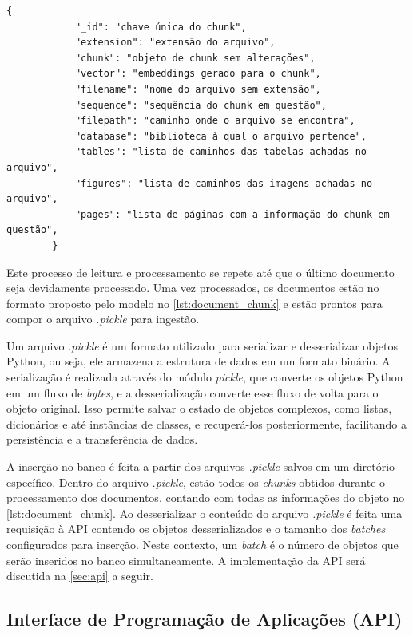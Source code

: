 \documentclass[a4paper, 12pt]{article}
\begin{document}
    \begin{lstlisting}[caption={Objeto de dados para inserção no banco vetorial.}, label={lst:document_chunk}]
        {
            "_id": "chave única do chunk",
            "extension": "extensão do arquivo",
            "chunk": "objeto de chunk sem alterações",
            "vector": "embeddings gerado para o chunk",
            "filename": "nome do arquivo sem extensão",
            "sequence": "sequência do chunk em questão",
            "filepath": "caminho onde o arquivo se encontra",
            "database": "biblioteca à qual o arquivo pertence",
            "tables": "lista de caminhos das tabelas achadas no arquivo",
            "figures": "lista de caminhos das imagens achadas no arquivo",
            "pages": "lista de páginas com a informação do chunk em questão",
        }
    \end{lstlisting}

    Este processo de leitura e processamento se repete até que o último documento seja devidamente processado. Uma vez processados, os documentos estão no formato proposto pelo modelo no \autoref{lst:document_chunk} e estão prontos para compor o arquivo \textit{.pickle} para ingestão. 
    
    Um arquivo \textit{.pickle} é um formato utilizado para serializar e desserializar objetos Python, ou seja, ele armazena a estrutura de dados em um formato binário. A serialização é realizada através do módulo \textit{pickle}, que converte os objetos Python em um fluxo de \textit{bytes}, e a desserialização converte esse fluxo de volta para o objeto original. Isso permite salvar o estado de objetos complexos, como listas, dicionários e até instâncias de classes, e recuperá-los posteriormente, facilitando a persistência e a transferência de dados.

    A inserção no banco é feita a partir dos arquivos \textit{.pickle} salvos em um diretório específico. Dentro do arquivo \textit{.pickle}, estão todos os \textit{chunks} obtidos durante o processamento dos documentos, contando com todas as informações do objeto no \autoref{lst:document_chunk}. Ao desserializar o conteúdo do arquivo \textit{.pickle} é feita uma requisição à API contendo os objetos desserializados e o tamanho dos \textit{batches} configurados para inserção. Neste contexto, um \textit{batch} é o número de objetos que serão inseridos no banco simultaneamente. A implementação da API será discutida na \autoref{sec:api} a seguir.

    \subsection{Interface de Programação de Aplicações (API)}\label{sec:api}
\end{document}
